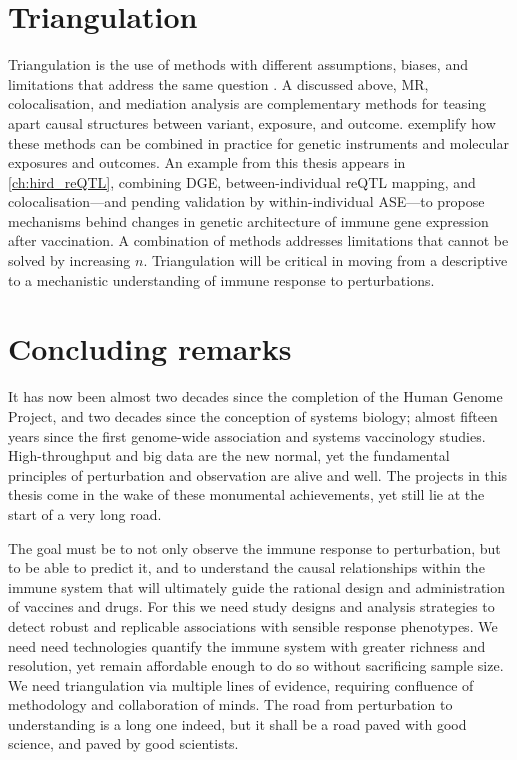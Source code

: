 \section{Triangulation}

Triangulation is the use of methods with different assumptions, biases, and limitations that address the same question \autocite{munafo2018RobustResearchNeeds}.
A discussed above, \gls{MR}, colocalisation, and mediation analysis are complementary methods for teasing apart causal structures between variant, exposure, and outcome.
\textcite{taylor2019IntegrativeAnalysisGene,zheng2019PhenomewideMendelianRandomization} exemplify how these methods can be combined in practice for genetic instruments and molecular exposures and outcomes.
An example from this thesis appears in \cref{ch:hird_reQTL}, 
combining \gls{DGE}, between-individual \gls{reQTL} mapping, and colocalisation---and pending validation by within-individual \gls{ASE}---to propose mechanisms behind changes in genetic architecture of immune gene expression after vaccination.
%
%
A combination of methods addresses limitations that cannot be solved by increasing $n$.
Triangulation will be critical in moving from a descriptive to a mechanistic understanding of immune response to perturbations.

\section{Concluding remarks}

It has now been almost two decades since the completion of the Human Genome Project,
and two decades since the conception of systems biology;
almost fifteen years since the first genome-wide association and systems vaccinology studies.
High-throughput and big data are the new normal,
yet the fundamental principles of perturbation and observation are alive and well.
The projects in this thesis come in the wake of these monumental achievements,
yet still lie at the start of a very long road.

The goal must be to not only observe the immune response to perturbation,
but to be able to predict it,
and to understand the causal relationships within the immune system that will ultimately guide the rational design and administration of vaccines and drugs.
For this we need study designs and analysis strategies to detect robust and replicable associations with sensible response phenotypes.
We need need technologies quantify the immune system with greater richness and resolution, yet remain affordable enough to do so without sacrificing sample size.
We need triangulation via multiple lines of evidence, 
requiring confluence of methodology and collaboration of minds.
The road from perturbation to understanding is a long one indeed,
but it shall be a road paved with good science,
and paved by good scientists.

